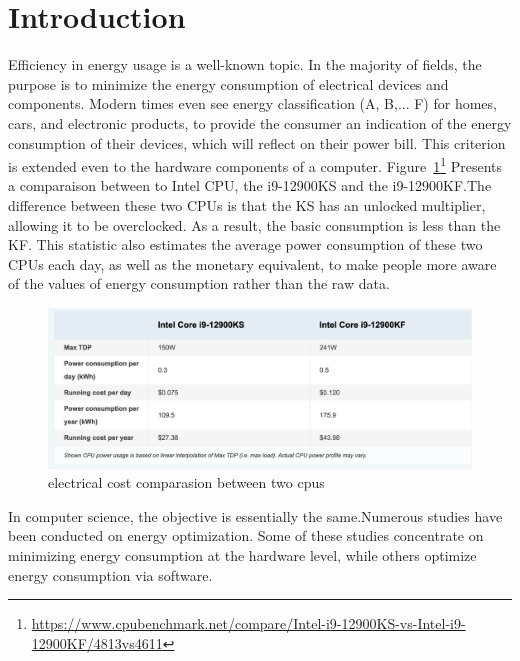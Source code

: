

\section{Introduction}
Efficiency in energy usage is a well-known topic. In the majority of fields, the purpose is to minimize the energy consumption of electrical devices and components. Modern times even see energy classification (A, B,... F) for homes, cars, and electronic products, to provide the consumer an indication of the energy consumption of their devices, which will reflect on their power bill. This criterion is extended even to the hardware components of a computer.
Figure~\ref{fig:soa_comparaisoncpu}\footnote{\url{https://www.cpubenchmark.net/compare/Intel-i9-12900KS-vs-Intel-i9-12900KF/4813vs4611}} Presents a comparaison between to Intel CPU, the i9-12900KS and the i9-12900KF.The difference between these two CPUs is that the KS has an unlocked multiplier, allowing it to be overclocked. As a result, the basic consumption is less than the KF. This statistic also estimates the average power consumption of these two CPUs each day, as well as the monetary equivalent, to make people more aware of the values of energy consumption rather than the raw data.


\begin{figure}
    \includegraphics[width=\linewidth]{imgs/cpu_cost_comparaison}
    \caption{electrical cost comparasion between two cpus }
    \label{fig:soa_comparaisoncpu}
\end{figure}

In computer science, the objective is essentially the same.Numerous studies have been conducted on energy optimization. Some of these studies concentrate on minimizing energy consumption at the hardware level, while others optimize energy consumption via software.


